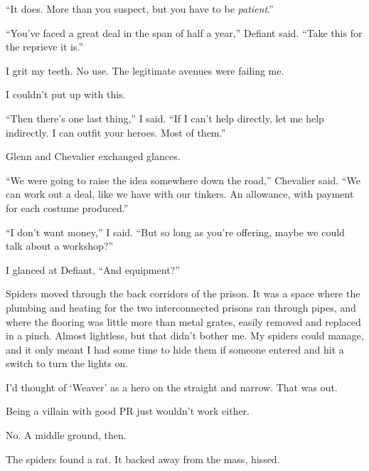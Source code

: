 ``It does.  More than you suspect, but you have to be \emph{patient}.''



``You've faced a great deal in the span of half a year,'' Defiant said.  ``Take this for the reprieve it is.''



I grit my teeth.  No use.  The legitimate avenues were failing me.



I couldn't put up with this.



``Then there's one last thing,'' I said.  ``If I can't help directly, let me help indirectly.  I can outfit your heroes.  Most of them.''



Glenn and Chevalier exchanged glances.



``We were going to raise the idea somewhere down the road,'' Chevalier said.  ``We can work out a deal, like we have with our tinkers.  An allowance, with payment for each costume produced.''



``I don't want money,'' I said.  ``But so long as you're offering, maybe we could talk about a workshop?''



I glanced at Defiant, ``And equipment?''



\sectionbreak



Spiders moved through the back corridors of the prison.  It was a space where the plumbing and heating for the two interconnected prisons ran through pipes, and where the flooring was little more than metal grates, easily removed and replaced in a pinch.  Almost lightless, but that didn't bother me.  My spiders could manage, and it only meant I had some time to hide them if someone entered and hit a switch to turn the lights on.



I'd thought of `Weaver' as a hero on the straight and narrow.  That was out.



Being a villain with good PR just wouldn't work either.



No.  A middle ground, then.



The spiders found a rat.  It backed away from the mass, hissed.



